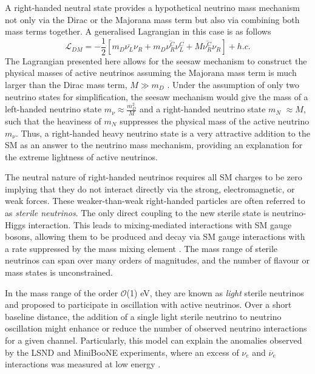 A right-handed neutral state provides a hypothetical neutrino mass mechanism not only via the Dirac or the Majorana mass term but also via combining both mass terms together.
A generalised Lagrangian in this case is as follows \cite{Thomson}
\begin{equation}
	\mathcal{L}_{DM} = -\frac{1}{2}[m_D\overline{\nu_{L}}\nu_{R} + m_D\overline{\nu_{R}^{C}}\nu_{L}^C + M\overline{\nu_{R}^{C}}\nu_{R}] + h.c.
\end{equation}
The Lagrangian presented here allows for the seesaw mechanism to construct the physical masses of active neutrinos assuming the Majorana mass term is much larger than the Dirac mass term, $M \gg m_D$ \cite{Thomson, nuMass}.
Under the assumption of only two neutrino states for simplification, the seesaw mechanism would give the mass of a left-handed neutrino state $m_{\nu} \approx \frac{m_D^2}{M}$ and a right-handed neutrino state $m_N$ $\approx M$, such that the heaviness of $m_N$ suppresses the physical mass of the active neutrino $m_\nu$.
Thus, a right-handed heavy neutrino state is a very attractive addition to the SM as an answer to the neutrino mass mechanism, providing an explanation for the extreme lightness of active neutrinos.

The neutral nature of right-handed neutrinos requires all SM charges to be zero implying that they do not interact directly via the strong, electromagnetic, or weak forces.
These weaker-than-weak right-handed particles are often referred to as \textit{sterile neutrinos}.
The only direct coupling to the new sterile state is neutrino-Higgs interaction.
This leads to mixing-mediated interactions with SM gauge bosons, allowing them to be produced and decay via SM gauge interactions with a rate suppressed by the mass mixing element \cite{SBNHNL}.
The mass range of sterile neutrinos can span over many orders of magnitudes, and the number of flavour or mass states is unconstrained.

In the mass range of the order $\mathcal{O}$(1) eV, they are known as \textit{light} sterile neutrinos and proposed to participate in oscillation with active neutrinos.
Over a short baseline distance, the addition of a single light sterile neutrino to neutrino oscillation might enhance or reduce the number of observed neutrino interactions for a given channel. 
Particularly, this model can explain the anomalies observed by the LSND and MiniBooNE experiments, where an excess of $\nu_e$ and $\overline{\nu}_e$ interactions was measured at low energy \cite{HNLWhitePaper}. 

